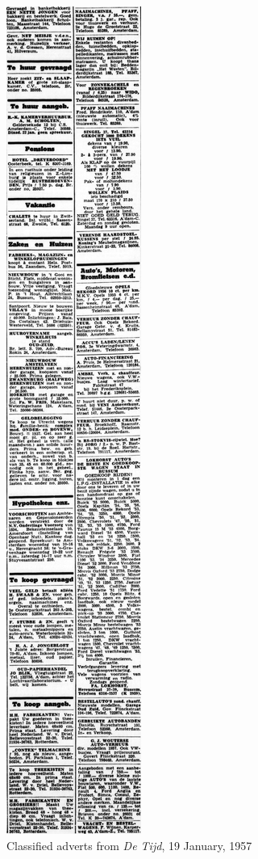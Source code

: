 \documentclass[USenglish]{article}
\begin{document}
\begin{figure}
  \vspace{-10mm}
  \begin{center}
    \includegraphics[height=0.40\textheight]{figures/classifieds}
  \end{center}
  \caption{Classified adverts from \textit{De Tijd}, 19 January, 1957}
  \vspace{-7mm}
  \label{fig:classifieds}
\end{figure}
\end{document}
